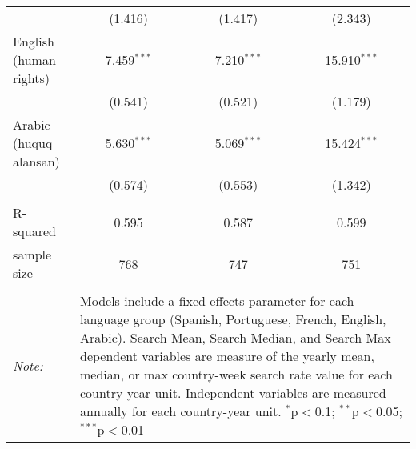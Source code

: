 \begin{table}[!htbp]
\begin{tabular}{@{\extracolsep{5pt}}lccc}
  & (1.416) & (1.417) & (2.343) \\ 
  English (human rights) & 7.459$^{***}$ & 7.210$^{***}$ & 15.910$^{***}$ \\ 
  & (0.541) & (0.521) & (1.179) \\ 
  Arabic (huquq alansan) & 5.630$^{***}$ & 5.069$^{***}$ & 15.424$^{***}$ \\ 
  & (0.574) & (0.553) & (1.342) \\ 
 \hline \\[-1.8ex] 
R-squared  & 0.595 & 0.587 & 0.599 \\ 
sample size  & 768 & 747 & 751 \\ 
\hline 
\hline \\[-1.8ex] 
\textit{Note:}  & \multicolumn{3}{l}{\parbox[t]{8cm}{Models include a fixed effects parameter for each language group (Spanish, Portuguese, French, English, Arabic). Search Mean, Search Median, and Search Max dependent variables are measure of the yearly mean, median, or max country-week search rate value for each country-year unit. Independent variables are measured annually for each country-year unit. $^{*}$p$<$0.1; $^{**}$p$<$0.05; $^{***}$p$<$0.01}} \\ 
\end{tabular} 
\end{table} 
